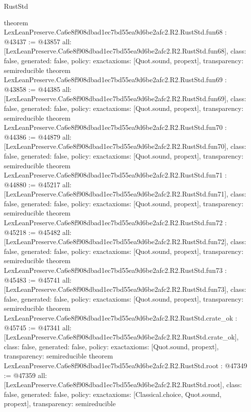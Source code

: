 \begin{lexlean}{RustStd}
\begin{coremodule}
{}
theorem LexLeanPreserve.Ca6e8f908dbad1ec7bd55ea9d6be2afc2.R2.RustStd.fun68 : @43437 := @43857 {
  all: [LexLeanPreserve.Ca6e8f908dbad1ec7bd55ea9d6be2afc2.R2.RustStd.fun68],
  class: false,
  generated: false,
  policy: exact{axioms: [Quot.sound, propext]},
  transparency: semireducible
}
theorem LexLeanPreserve.Ca6e8f908dbad1ec7bd55ea9d6be2afc2.R2.RustStd.fun69 : @43858 := @44385 {
  all: [LexLeanPreserve.Ca6e8f908dbad1ec7bd55ea9d6be2afc2.R2.RustStd.fun69],
  class: false,
  generated: false,
  policy: exact{axioms: [Quot.sound, propext]},
  transparency: semireducible
}
theorem LexLeanPreserve.Ca6e8f908dbad1ec7bd55ea9d6be2afc2.R2.RustStd.fun70 : @44386 := @44879 {
  all: [LexLeanPreserve.Ca6e8f908dbad1ec7bd55ea9d6be2afc2.R2.RustStd.fun70],
  class: false,
  generated: false,
  policy: exact{axioms: [Quot.sound, propext]},
  transparency: semireducible
}
theorem LexLeanPreserve.Ca6e8f908dbad1ec7bd55ea9d6be2afc2.R2.RustStd.fun71 : @44880 := @45217 {
  all: [LexLeanPreserve.Ca6e8f908dbad1ec7bd55ea9d6be2afc2.R2.RustStd.fun71],
  class: false,
  generated: false,
  policy: exact{axioms: [Quot.sound, propext]},
  transparency: semireducible
}
theorem LexLeanPreserve.Ca6e8f908dbad1ec7bd55ea9d6be2afc2.R2.RustStd.fun72 : @45218 := @45482 {
  all: [LexLeanPreserve.Ca6e8f908dbad1ec7bd55ea9d6be2afc2.R2.RustStd.fun72],
  class: false,
  generated: false,
  policy: exact{axioms: [Quot.sound, propext]},
  transparency: semireducible
}
theorem LexLeanPreserve.Ca6e8f908dbad1ec7bd55ea9d6be2afc2.R2.RustStd.fun73 : @45483 := @45741 {
  all: [LexLeanPreserve.Ca6e8f908dbad1ec7bd55ea9d6be2afc2.R2.RustStd.fun73],
  class: false,
  generated: false,
  policy: exact{axioms: [Quot.sound, propext]},
  transparency: semireducible
}
theorem LexLeanPreserve.Ca6e8f908dbad1ec7bd55ea9d6be2afc2.R2.RustStd.crate_ok : @45745 := @47341 {
  all: [LexLeanPreserve.Ca6e8f908dbad1ec7bd55ea9d6be2afc2.R2.RustStd.crate_ok],
  class: false,
  generated: false,
  policy: exact{axioms: [Quot.sound, propext]},
  transparency: semireducible
}
theorem LexLeanPreserve.Ca6e8f908dbad1ec7bd55ea9d6be2afc2.R2.RustStd.root : @47349 := @47359 {
  all: [LexLeanPreserve.Ca6e8f908dbad1ec7bd55ea9d6be2afc2.R2.RustStd.root],
  class: false,
  generated: false,
  policy: exact{axioms: [Classical.choice, Quot.sound, propext]},
  transparency: semireducible
}


\end{coremodule}
\end{lexlean}
